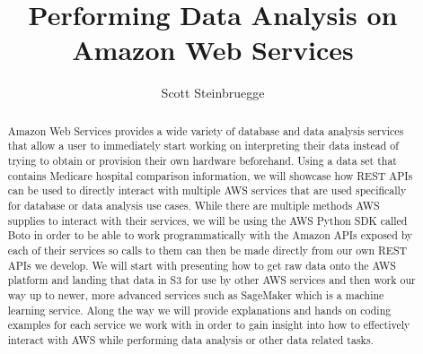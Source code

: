 
\title{Performing Data Analysis on Amazon Web Services}

\author{Scott Steinbruegge}


\renewcommand{\shortauthors}{S. Steinbruegge}


\begin{abstract}
Amazon Web Services provides a wide variety of database and data analysis
 services that allow a user to immediately start working on interpreting 
their data instead of trying to obtain or provision their own hardware 
beforehand. Using a data set that contains Medicare hospital comparison 
information, we will showcase how REST APIs can be used to directly interact 
with multiple AWS services that are used specifically for database or data 
analysis use cases. While there are multiple methods AWS supplies to interact 
with their services, we will be using the AWS Python SDK called Boto in order 
to be able to work programmatically with the Amazon APIs exposed by each of 
their services so calls to them can then be made directly from our own REST 
APIs we develop. We will start with presenting how to get raw data onto the 
AWS platform and landing that data in S3 for use by other AWS services and 
then work our way up to newer, more advanced services such as SageMaker which 
is a machine learning service. Along the way we will provide explanations 
and hands on coding examples for each service we work with in order to gain 
insight into how to effectively interact with AWS while performing data 
analysis or other data related tasks. 
\end{abstract}



\maketitle



 

